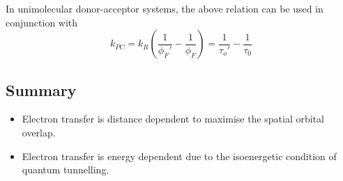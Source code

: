 \documentclass[a4paper]{tufte-handout}
\theoremstyle{definition}
\begin{document}
In unimolecular donor-acceptor systems, the above relation can be used in conjunction with
\begin{equation*}
  k_{PC} = k_R \left( \frac{1}{\phi_F'} - \frac{1}{\phi_F}\right) = \frac{1}{\tau_o'}- \frac{1}{\tau_0}
\end{equation*}

\subsection*{Summary}

\begin{itemize}
  \item Electron transfer is distance dependent to maximise the spatial orbital overlap.
  \item Electron transfer is energy dependent due to the isoenergetic condition of quantum tunnelling.
\end{itemize}



\end{document}
